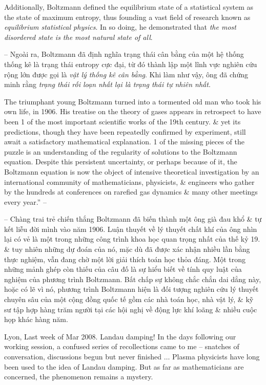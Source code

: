 \documentclass{article}
\begin{document}
\begin{enumerate}
	Additionally, Boltzmann defined the equilibrium state of a statistical system as the state of maximum entropy, thus founding a vast field of research known as {\it equilibrium statistical physics}. In so doing, he demonstrated that {\it the most disordered state is the most natural state of all}.
	
	-- Ngoài ra, Boltzmann đã định nghĩa trạng thái cân bằng của một hệ thống thống kê là trạng thái entropy cực đại, từ đó thành lập một lĩnh vực nghiên cứu rộng lớn được gọi là {\it vật lý thống kê cân bằng}. Khi làm như vậy, ông đã chứng minh rằng {\it trạng thái rối loạn nhất lại là trạng thái tự nhiên nhất}.
	
	The triumphant young Boltzmann turned into a tormented old man who took his own life, in 1906. His treatise on the theory of gases appears in retrospect to have been 1 of the most important scientific works of the 19th century. \& yet its predictions, though they have been repeatedly confirmed by experiment, still await a satisfactory mathematical explanation. 1 of the missing pieces of the puzzle is an understanding of the regularity of solutions to the Boltzmann equation. Despite this persistent uncertainty, or perhaps because of it, the Boltzmann equation is now the object of intensive theoretical investigation by an international community of mathematicians, physicists, \& engineers who gather by the hundreds at conferences on rarefied gas dynamics \& many other meetings every year.'' -- \cite[pp. 3--9]{Villani2015}
	
	-- Chàng trai trẻ chiến thắng Boltzmann đã biến thành một ông già đau khổ \& tự kết liễu đời mình vào năm 1906. Luận thuyết về lý thuyết chất khí của ông nhìn lại có vẻ là một trong những công trình khoa học quan trọng nhất của thế kỷ 19. \& tuy nhiên những dự đoán của nó, mặc dù đã được xác nhận nhiều lần bằng thực nghiệm, vẫn đang chờ một lời giải thích toán học thỏa đáng. Một trong những mảnh ghép còn thiếu của câu đố là sự hiểu biết về tính quy luật của nghiệm của phương trình Boltzmann. Bất chấp sự không chắc chắn dai dẳng này, hoặc có lẽ vì nó, phương trình Boltzmann hiện là đối tượng nghiên cứu lý thuyết chuyên sâu của một cộng đồng quốc tế gồm các nhà toán học, nhà vật lý, \& kỹ sư tập hợp hàng trăm người tại các hội nghị về động lực khí loãng \& nhiều cuộc họp khác hàng năm.
	
	 Lyon, Last week of Mar 2008. Landau damping! In the days following our working session, a confused series of recollections came to me -- snatches of conversation, discussions begun but never finished $\ldots$ Plasma physicists have long been used to the idea of Landau damping. But as far as mathematicians are concerned, the phenomenon remains a mystery.
	

\end{enumerate}
\end{document}
